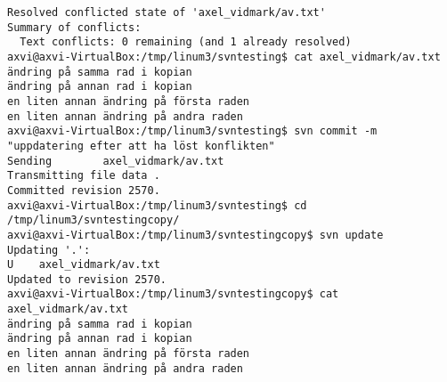 \documentclass[10pt, a4paper]{article}
\begin{document}
\begin{itemize}
\begin{verbatim}
Resolved conflicted state of 'axel_vidmark/av.txt'
Summary of conflicts:
  Text conflicts: 0 remaining (and 1 already resolved)
axvi@axvi-VirtualBox:/tmp/linum3/svntesting$ cat axel_vidmark/av.txt 
ändring på samma rad i kopian
ändring på annan rad i kopian
en liten annan ändring på första raden
en liten annan ändring på andra raden
axvi@axvi-VirtualBox:/tmp/linum3/svntesting$ svn commit -m "uppdatering efter att ha löst konflikten"
Sending        axel_vidmark/av.txt
Transmitting file data .
Committed revision 2570.
axvi@axvi-VirtualBox:/tmp/linum3/svntesting$ cd /tmp/linum3/svntestingcopy/
axvi@axvi-VirtualBox:/tmp/linum3/svntestingcopy$ svn update
Updating '.':
U    axel_vidmark/av.txt
Updated to revision 2570.
axvi@axvi-VirtualBox:/tmp/linum3/svntestingcopy$ cat axel_vidmark/av.txt 
ändring på samma rad i kopian
ändring på annan rad i kopian
en liten annan ändring på första raden
en liten annan ändring på andra raden
\end{verbatim}
\end{itemize}




%  
\end{document}
